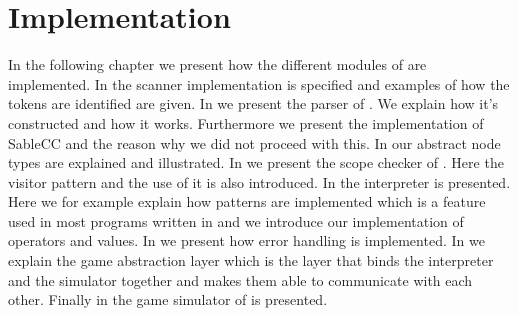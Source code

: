\chapter{Implementation}
\label{chap:implementation}

In the following chapter we present how the different modules of \productname{} are implemented. In  the scanner implementation is specified and examples of how the tokens are identified are given. In  we present the parser of
\productname{}. We explain how it's constructed and how it works. Furthermore we present the implementation of SableCC and the reason why we did not proceed with this. In  our abstract node types are explained and illustrated. In  we present the scope checker of \productname{}. Here the visitor pattern and the use of it is also introduced. In  the interpreter is presented. Here we for example explain how patterns are implemented which is a feature used in most programs written in \productname{} and we introduce our implementation of operators and values. In  we present how error handling is implemented. In  we explain the game abstraction layer which is the layer that binds the interpreter and the simulator together and makes them able to communicate with each other. Finally in  the game simulator of \productname{} is presented.    











